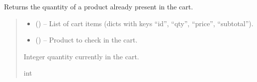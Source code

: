 \documentclass[a4paper,11pt,spanish]{sphinxmanual}
\begin{document}

\begin{fulllineitems}
\label{\detokenize{api/sale/sale.services:sale.services.current_qty_in_cart}}
\pysigstartsignatures
\pysiglinewithargsret
{}
{\sphinxparamcomma {}}
{}
\pysigstopsignatures
\sphinxAtStartPar
Returns the quantity of a product already present in the cart.
\begin{quote}\begin{description}
\begin{itemize}
\item {} 
\sphinxAtStartPar
{} (\sphinxstyleliteralemphasis{\sphinxupquote{{[}}}\sphinxstyleliteralemphasis{\sphinxupquote{{]}}}) – List of cart items (dicts with keys “id”, “qty”, “price”, “subtotal”).

\item {} 
\sphinxAtStartPar
{} () – Product to check in the cart.

\end{itemize}

\sphinxAtStartPar
Integer quantity currently in the cart.

\sphinxAtStartPar
int

\end{description}\end{quote}

\end{fulllineitems}

\end{document}
